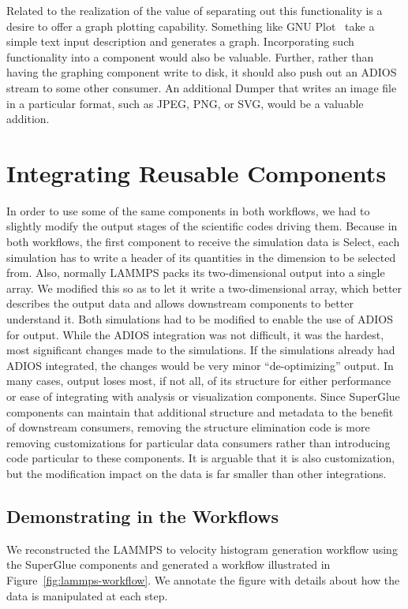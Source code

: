 \documentclass[conference]{IEEEtran}
\begin{document}
Related to the realization of the value of separating out this functionality is
a desire to offer a graph plotting capability. Something like GNU
Plot~\cite{racine:2006:gnuplot} take a simple text input description and
generates a graph.  Incorporating such functionality into a component would
also be valuable.  Further, rather than having the graphing component write to
disk, it should also push out an ADIOS stream to some other consumer. An
additional Dumper that writes an image file in a particular format, such as
JPEG, PNG, or SVG, would be a valuable addition.

\section{Integrating Reusable Components}

In order to use some of the same components in both workflows, we had to
slightly modify the output stages of the scientific codes driving them. Because
in both workflows, the first component to receive the simulation data is
Select, each simulation has to write a header of its quantities in the
dimension to be selected from. Also, normally LAMMPS packs its two-dimensional
output into a single array. We modified this so as to let it write a
two-dimensional array, which better describes the output data and allows
downstream components to better understand it. Both simulations had to be
modified to enable the use of ADIOS for output. While the ADIOS integration was
not difficult, it was the hardest, most significant changes made to the
simulations. If the simulations already had ADIOS integrated, the changes would
be very minor ``de-optimizing'' output. In many cases, output loses most, if
not all, of its structure for either performance or ease of integrating with
analysis or visualization components. Since SuperGlue components can maintain
that additional structure and metadata to the benefit of downstream consumers,
removing the structure elimination code is more removing customizations for
particular data consumers rather than introducing code particular to these
components. It is arguable that it is also customization, but the modification
impact on the data is far smaller than other integrations.

\subsection{Demonstrating in the Workflows}

We reconstructed the LAMMPS to velocity histogram generation workflow using the
SuperGlue components and generated a workflow illustrated in
Figure~\ref{fig:lammps-workflow}. We annotate the figure with details about how
the data is manipulated at each step.
\end{document}
